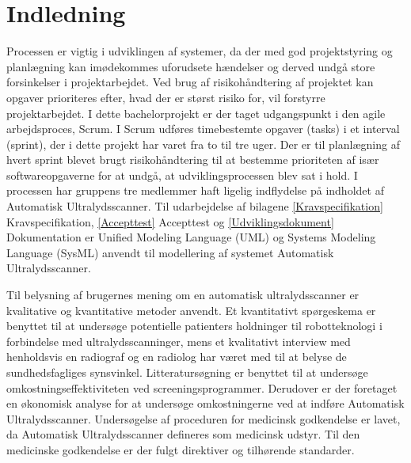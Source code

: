 
\chapter{Indledning}\label{kapInd}
Processen er vigtig i udviklingen af systemer, da der med god projektstyring og planlægning kan imødekommes uforudsete hændelser og derved undgå store forsinkelser i projektarbejdet. Ved brug af risikohåndtering af projektet kan opgaver prioriteres efter, hvad der er størst risiko for, vil forstyrre projektarbejdet. I dette bachelorprojekt er der taget udgangspunkt i den agile arbejdsproces, Scrum. I Scrum udføres timebestemte opgaver (tasks) i et interval (sprint), der i dette projekt har varet fra to til tre uger. Der er til planlægning af hvert sprint blevet brugt risikohåndtering til at bestemme prioriteten af især softwareopgaverne for at undgå, at udviklingsprocessen blev sat i hold. 
I processen har gruppens tre medlemmer haft ligelig indflydelse på indholdet af Automatisk Ultralydsscanner. Til udarbejdelse af bilagene \ref{Kravspecifikation} Kravspecifikation, \ref{Accepttest} Accepttest og \ref{Udviklingsdokument} Dokumentation er Unified Modeling Language (UML) og Systems Modeling Language (SysML) anvendt til modellering af systemet Automatisk Ultralydsscanner.

Til belysning af brugernes mening om en automatisk ultralydsscanner er kvalitative og kvantitative metoder anvendt. Et kvantitativt spørgeskema er benyttet til at undersøge potentielle patienters
holdninger til robotteknologi i forbindelse med ultralydsscanninger, mens et kvalitativt
interview med henholdsvis en radiograf og en radiolog har været med til at belyse de sundhedsfagliges
synsvinkel. Litteratursøgning er benyttet til at undersøge omkostningseffektiviteten ved screeningsprogrammer. Derudover er der foretaget en økonomisk analyse for at undersøge omkostningerne ved at indføre Automatisk Ultralydsscanner. Undersøgelse af proceduren for medicinsk godkendelse er lavet, da Automatisk Ultralydsscanner defineres som medicinsk udstyr. Til den medicinske godkendelse er der fulgt direktiver og tilhørende standarder. 



